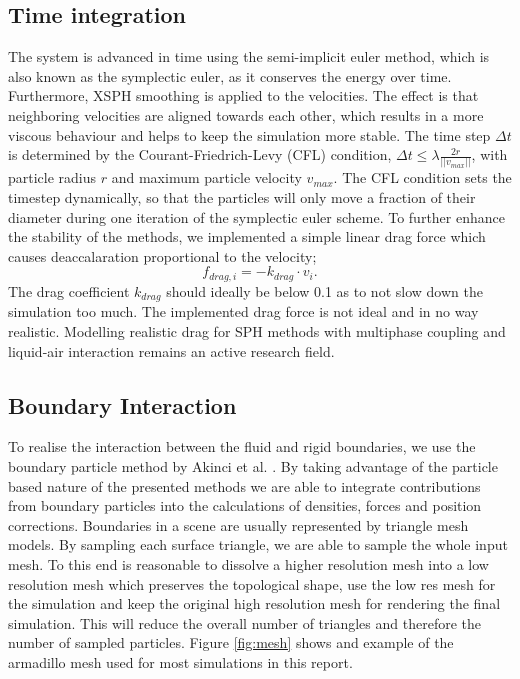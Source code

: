\documentclass[11pt, letterpaper, twocolumn]{article}
\begin{document}
\subsection{Time integration}
The system is advanced in time using the semi-implicit euler method, which is also known as the symplectic euler, as it conserves the energy over time.
Furthermore, XSPH smoothing is applied to the velocities.
The effect is that neighboring velocities are aligned towards each other, which results in a more viscous behaviour and helps to keep the simulation more stable.
The time step \(\Delta t\) is determined by the Courant-Friedrich-Levy (CFL) condition, \( \Delta t \leq \lambda \frac{2r}{||v_{max}||}\), with particle radius \(r\) and maximum particle velocity \(v_{max}\). The CFL condition sets the timestep dynamically, so that the particles will only move a fraction of their diameter during one iteration of the symplectic euler scheme. 
To further enhance the stability of the methods, we implemented a simple linear drag force which causes deaccalaration proportional to the velocity;
\begin{equation}
  f_{drag,i} = -k_{drag} \cdot v_i.
\end{equation}
The drag coefficient \(k_{drag}\) should ideally be below 0.1 as to not slow down the simulation too much. The implemented drag force is not ideal and in no way realistic. Modelling realistic drag for SPH methods with multiphase coupling and liquid-air interaction remains an active research field.

\subsection{Boundary Interaction}
To realise the interaction between the fluid and rigid boundaries, we use the boundary particle method by Akinci et al. \cite{akinci2012}. By taking advantage of the particle based nature of the presented methods we are able to integrate contributions from boundary particles into the calculations of densities, forces and position corrections.
Boundaries in a scene are usually represented by triangle mesh models. By sampling each surface triangle, we are able to sample the whole input mesh.
To this end is reasonable to dissolve a higher resolution mesh into a low resolution mesh which preserves the topological shape, use the low res mesh for the simulation and keep the original high resolution mesh for rendering the final simulation. This will reduce the overall number of triangles and therefore the number of sampled particles. Figure \ref{fig:mesh} shows and example of the armadillo mesh used for most simulations in this report.
\end{document}
